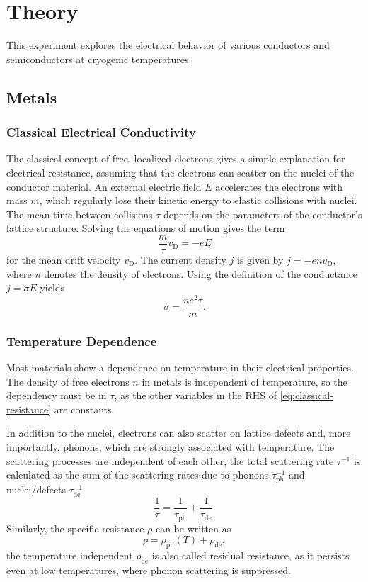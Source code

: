 \chapter{Theory}\label{chap:theory}
This experiment explores the electrical behavior of various conductors and semiconductors at cryogenic temperatures.

\section{Metals}

\subsection{Classical Electrical Conductivity}
The classical concept of free, localized electrons gives a simple explanation for electrical resistance, assuming that the electrons can scatter on the nuclei of the conductor material.
An external electric field $E$ accelerates the electrons with mass $m$, which regularly lose their kinetic energy to elastic collisions with nuclei.
The mean time between collisions $\tau$ depends on the parameters of the conductor's lattice structure.
Solving the equations of motion gives the term
\begin{equation*}
	\frac{m}{\tau} v_\text{D} = - e E
\end{equation*}
for the mean drift velocity $v_\text{D}$. The current density $j$ is given by $j = - e n v_\text{D}$, where $n$ denotes the density of electrons.
Using the definition of the conductance $j = \sigma E$ yields
\begin{equation}\label{eq:classical-resistance}
	\sigma = \frac{n e^2 \tau}{m}.
\end{equation}

\subsection{Temperature Dependence}
Most materials show a dependence on temperature in their electrical properties.
The density of free electrons $n$ in metals is independent of temperature, so the dependency must be in $\tau$, as the other variables in the RHS of \autoref{eq:classical-resistance} are constants.

In addition to the nuclei, electrons can also scatter on lattice defects and, more importantly, phonons, which are strongly associated with temperature.
The scattering processes are independent of each other, the total scattering rate $\tau^{-1}$ is calculated as the sum of the scattering rates due to phonons $\tau_\text{ph}^{-1}$ and nuclei/defects $\tau_\text{de}^{-1}$
\begin{equation*}
	\frac{1}{\tau} = \frac{1}{\tau_\text{ph}} + \frac{1}{\tau_\text{de}}.
\end{equation*}
Similarly, the specific resistance $\rho$ can be written as
\begin{equation*}
	\rho = \rho_\text{ph}(T) + \rho_\text{de},
\end{equation*}
the temperature independent $\rho_\text{de}$ is also called residual resistance, as it persists even at low temperatures, where phonon scattering is suppressed.

